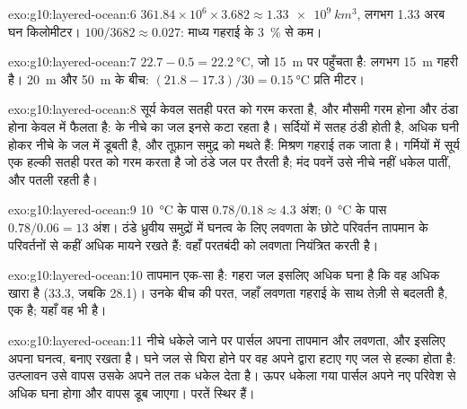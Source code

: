 \begin{solution}{exo:g10:layered-ocean:6}
$361.84\times10^6 \times 3.682 \approx \qty{1.33e9}{km^3}$, लगभग
\num{1.33} अरब घन किलोमीटर। $100/3682 \approx 0.027$: माध्य गहराई के
\qty{3}{\percent} से कम।
\end{solution}

\begin{solution}{exo:g10:layered-ocean:7}
$22.7 - 0.5 = \qty{22.2}{\degreeCelsius}$, जो \qty{15}{m} पर पहुँचता है:  लगभग \qty{15}{m} गहरी है। \qty{20}{m} और \qty{50}{m} के बीच:
$(21.8 - 17.3)/30 = \qty{0.15}{\degreeCelsius}$ प्रति मीटर।
\end{solution}

\begin{solution}{exo:g10:layered-ocean:8}
सूर्य केवल सतही परत को गरम करता है, और मौसमी गरम होना और ठंडा होना
केवल  में फैलता है:  के नीचे का जल
इनसे कटा रहता है। सर्दियों में सतह ठंडी होती है, अधिक घनी होकर नीचे के जल में
डूबती है, और तूफ़ान समुद्र को मथते हैं: मिश्रण गहराई तक जाता है। गर्मियों में
सूर्य एक हल्की सतही परत को गरम करता है जो ठंडे जल पर तैरती है; मंद
पवनें उसे नीचे नहीं धकेल पातीं, और  पतली रहती है।
\end{solution}

\begin{solution}{exo:g10:layered-ocean:9}
\qty{10}{\degreeCelsius} के पास $0.78/0.18 \approx 4.3$ अंश;
\qty{0}{\degreeCelsius} के पास $0.78/0.06 = 13$ अंश। ठंडे ध्रुवीय समुद्रों में
घनत्व के लिए लवणता के छोटे परिवर्तन तापमान के परिवर्तनों से कहीं अधिक
मायने रखते हैं: वहाँ परतबंदी को लवणता नियंत्रित करती है।
\end{solution}

\begin{solution}{exo:g10:layered-ocean:10}
तापमान एक-सा है: गहरा जल इसलिए अधिक घना है कि वह
अधिक खारा है (33.3, जबकि 28.1)। उनके बीच की परत, जहाँ लवणता गहराई के साथ तेज़ी से
बदलती है, एक  है; यहाँ वह  भी है।
\end{solution}

\begin{solution}{exo:g10:layered-ocean:11}
नीचे धकेले जाने पर पार्सल अपना तापमान और लवणता, और इसलिए अपना घनत्व, बनाए रखता है।
घने जल से घिरा होने पर वह अपने द्वारा हटाए गए जल से हल्का होता है:
उत्प्लावन उसे वापस उसके अपने तल तक धकेल देता है। ऊपर धकेला गया पार्सल अपने
नए परिवेश से अधिक घना होगा और वापस डूब जाएगा। परतें स्थिर हैं।
\end{solution}

